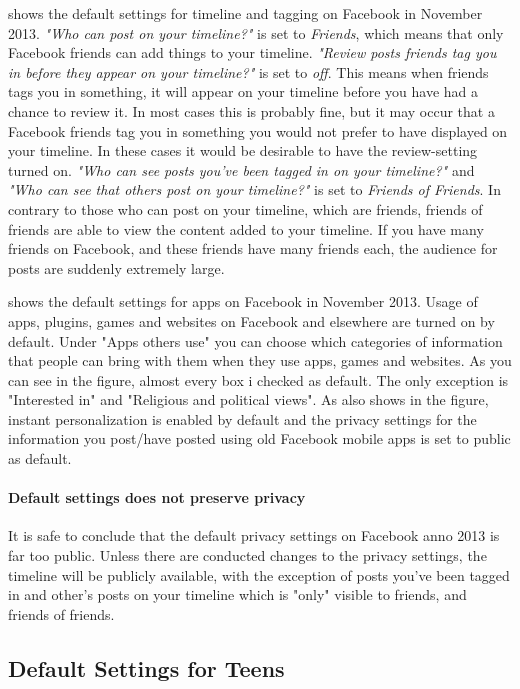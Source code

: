  shows the default settings for timeline and tagging on Facebook in November 2013. \textit{"Who can post on your timeline?"} is set to \textit{Friends}, which means that only Facebook friends can add things to your timeline. \textit{"Review posts friends tag you in before they appear on your timeline?" }is set to\textit{ off}. This means when friends tags you in something, it will appear on your timeline before you have had a chance to review it. In most cases this is probably fine, but it may occur that a Facebook friends tag you in something you would not prefer to have displayed on your timeline. In these cases it would be desirable to have the review-setting turned on. \textit{"Who can see posts you've been tagged in on your timeline?"} and \textit{"Who can see that others post on your timeline?"} is set to \textit{Friends of Friends}. In contrary to those who can post on your timeline, which are friends, friends of friends are able to view the content added to your timeline. If you have many friends on Facebook, and these friends have many friends each, the audience for posts are suddenly extremely large. 

 shows the default settings for apps on Facebook in November 2013. Usage of apps, plugins, games and websites on Facebook and elsewhere are turned on by default. Under "Apps others use" you can choose which categories of information that people can bring with them when they use apps, games and websites. As you can see in the figure, almost every box i checked as default. The only exception is "Interested in" and "Religious and political views". As also shows in the figure, instant personalization is enabled by default and the privacy settings for the information you post/have posted using old Facebook mobile apps is set to public as default. 

\paragraph{Default settings does not preserve privacy} It is safe to conclude that the default privacy settings on Facebook anno 2013 is far too public. Unless there are conducted changes to the privacy settings, the timeline will be publicly available, with the exception of posts you've been tagged in and other's posts on your timeline which is "only" visible to friends, and friends of friends. 

\subsection{Default Settings for Teens}

